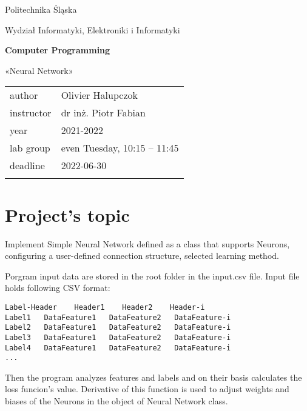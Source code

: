 \documentclass[12pt,a4paper,twoside]{article}
\let\oldmarginpar\marginpar
\renewcommand\marginpar[1]{%
  {\linespread{0.85}\normalfont\scriptsize%
\oldmarginpar[\hspace{1cm}\begin{minipage}{3cm}\raggedleft\scriptsize\color{black}\textsf{#1}\end{minipage}]%
{\hspace{0cm}\begin{minipage}{3cm}\raggedright\scriptsize\color{black}\textsf{#1}\end{minipage}}%
}%
}
\begin{document}
\frenchspacing
\thispagestyle{empty}
\begin{center}
   {\Large\sf Politechnika Śląska   %

      Wydział Informatyki, Elektroniki i Informatyki

   }

   \vfill



   \vfill\vfill

   {\Huge\sffamily\bfseries Computer Programming\par}

   \vfill\vfill

   {\LARGE\sf «Neural Network»}


   \vfill \vfill\vfill\vfill






   \begin{tabular}{ll}
      \toprule
      author     & Olivier Halupczok            \\
      instructor & dr inż. Piotr Fabian         \\
      year       & 2021-2022                    \\
      lab group  & even Tuesday, 10:15 -- 11:45 \\
      deadline   & 2022-06-30                   \\
      \bottomrule
                 &
   \end{tabular}

\end{center}

\cleardoublepage

\section{Project's topic}
Implement Simple Neural Network defined as a class that supports Neurons, configuring a user-defined connection structure, selected learning method.

Porgram input data are stored in the root folder in the input.csv file.
Input file holds following CSV format:
\begin{verbatim}
Label-Header    Header1    Header2    Header-i
Label1   DataFeature1   DataFeature2   DataFeature-i
Label2   DataFeature1   DataFeature2   DataFeature-i
Label3   DataFeature1   DataFeature2   DataFeature-i
Label4   DataFeature1   DataFeature2   DataFeature-i
...
\end{verbatim}
Then the program analyzes features and labels and on their basis calculates the loss funcion's value. Derivative of this function is used to adjust weights and biases of the Neurons in the object of Neural Network class.
\end{document}
